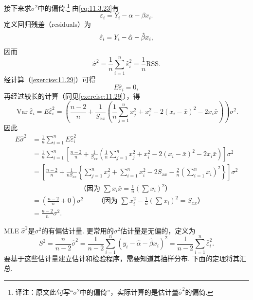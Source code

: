 接下来求$\sigma^2$中的偏倚.\footnote{译注：原文此句写“$\sigma^2$中的偏倚”，实际计算的是估计量$\hat\sigma^2$的偏倚.} 由\eqref{eq:11.3.23}有
$$\varepsilon_i=Y_i-\alpha-\beta x_i.$$
定义回归残差（residuals）为
\begin{equation}\label{eq:11.3.27}\index{SI0905@残差}
\hat\varepsilon_i=Y_i-\hat\alpha-\hat\beta x_i,
\end{equation}
因而
$$\hat\sigma^2=\frac1n\sum_{i=1}^n\hat\varepsilon_i^2=\frac1n\mathrm{RSS}.$$
经计算（\autoref{exercise:11.29}）可得
$$E\hat\varepsilon_i=0,$$
再经过较长的计算（同见\autoref{exercise:11.29}），得
\begin{equation}\label{eq:11.3.28}
\operatorname{Var}\hat\varepsilon_i=E\hat\varepsilon_i^2
=\left(\frac{n-2}n+\frac1{S_{xx}}\left(\frac1n\sum_{j=1}^nx_j^2+x_i^2-2(x_i-\bar x)^2-2x_i\bar x\right)\right)\sigma^2.
\end{equation}
因此
\begin{align*}
E\hat\sigma^2
&=\frac1n\sum_{i=1}^nE\hat\varepsilon_i^2\\
&=\frac1n\sum_{i=1}^n\left[\frac{n-2}n+\frac1{S_{xx}}\left(\frac1n\sum_{j=1}^nx_j^2+x_i^2-2(x_i-\bar x)^2-2x_i\bar x\right)\right]\sigma^2\\
&=\left[\frac{n-2}n+\frac1{nS_{xx}}\left\{\sum_{j=1}^nx_j^2+\sum_{i=1}^nx_i^2-2S_{xx}-\frac2n\left(\sum_{i=1}^nx_i\right)^2\right\}\right]\sigma^2\\
&\hspace{7em}\text{（因为 }\sum x_i\bar x=\tfrac1n(\sum x_i)^2\text{）}\\
&=\left(\frac{n-2}n+0\right)\sigma^2
\qquad\text{（因为 }\sum x_i^2-\tfrac1n(\sum x_i)^2=S_{xx}\text{）}\\
&=\frac{n-2}n\sigma^2.
\end{align*}

MLE $\hat\sigma^2$是$\sigma^2$的有偏估计量. 更常用的$\sigma^2$估计量是无偏的，定义为
\begin{equation}\label{eq:11.3.29}
S^2=\frac n{n-2}\hat\sigma^2
=\frac1{n-2}\sum_{i=1}^n(y_i-\hat\alpha-\hat\beta x_i)^2
=\frac1{n-2}\sum_{i=1}^n\hat\varepsilon_i^2.
\end{equation}
要基于这些估计量建立估计和检验程序，需要知道其抽样分布. 下面的定理将其汇总.

